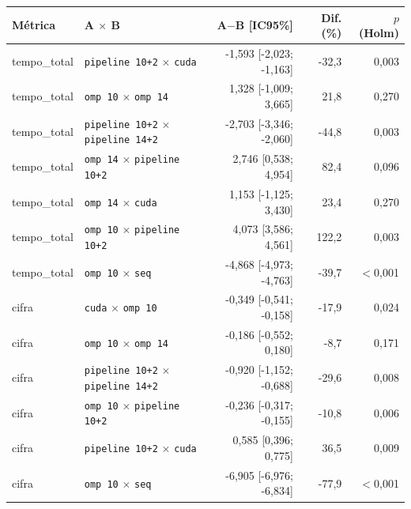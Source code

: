 \begin{tabular}{llrrr}
\hline
\textbf{M\'etrica} & \textbf{A $\times$ B} & \textbf{A$-$B [IC95\%]} & \textbf{Dif. (\%)} & \textbf{$p$ (Holm)} \\
\hline
tempo\_total & \texttt{pipeline 10+2} $\times$ \texttt{cuda} & -1,593 [-2,023; -1,163] & -32,3 & 0,003 \\
tempo\_total & \texttt{omp 10} $\times$ \texttt{omp 14} & 1,328 [-1,009; 3,665] & 21,8 & 0,270 \\
tempo\_total & \texttt{pipeline 10+2} $\times$ \texttt{pipeline 14+2} & -2,703 [-3,346; -2,060] & -44,8 & 0,003 \\
tempo\_total & \texttt{omp 14} $\times$ \texttt{pipeline 10+2} & 2,746 [0,538; 4,954] & 82,4 & 0,096 \\
tempo\_total & \texttt{omp 14} $\times$ \texttt{cuda} & 1,153 [-1,125; 3,430] & 23,4 & 0,270 \\
tempo\_total & \texttt{omp 10} $\times$ \texttt{pipeline 10+2} & 4,073 [3,586; 4,561] & 122,2 & 0,003 \\
tempo\_total & \texttt{omp 10} $\times$ \texttt{seq} & -4,868 [-4,973; -4,763] & -39,7 & $<$0,001 \\
cifra & \texttt{cuda} $\times$ \texttt{omp 10} & -0,349 [-0,541; -0,158] & -17,9 & 0,024 \\
cifra & \texttt{omp 10} $\times$ \texttt{omp 14} & -0,186 [-0,552; 0,180] & -8,7 & 0,171 \\
cifra & \texttt{pipeline 10+2} $\times$ \texttt{pipeline 14+2} & -0,920 [-1,152; -0,688] & -29,6 & 0,008 \\
cifra & \texttt{omp 10} $\times$ \texttt{pipeline 10+2} & -0,236 [-0,317; -0,155] & -10,8 & 0,006 \\
cifra & \texttt{pipeline 10+2} $\times$ \texttt{cuda} & 0,585 [0,396; 0,775] & 36,5 & 0,009 \\
cifra & \texttt{omp 10} $\times$ \texttt{seq} & -6,905 [-6,976; -6,834] & -77,9 & $<$0,001 \\
\hline
\end{tabular}
